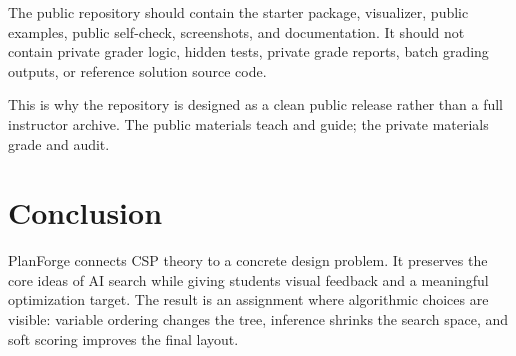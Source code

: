 \documentclass[11pt]{article}
\begin{document}
The public repository should contain the starter package, visualizer, public examples, public
self-check, screenshots, and documentation. It should not contain private grader logic, hidden
tests, private grade reports, batch grading outputs, or reference solution source code.

This is why the repository is designed as a clean public release rather than a full instructor
archive. The public materials teach and guide; the private materials grade and audit.

\section{Conclusion}

PlanForge connects CSP theory to a concrete design problem. It preserves the core ideas of AI
search while giving students visual feedback and a meaningful optimization target. The result is
an assignment where algorithmic choices are visible: variable ordering changes the tree, inference
shrinks the search space, and soft scoring improves the final layout.
\end{document}

